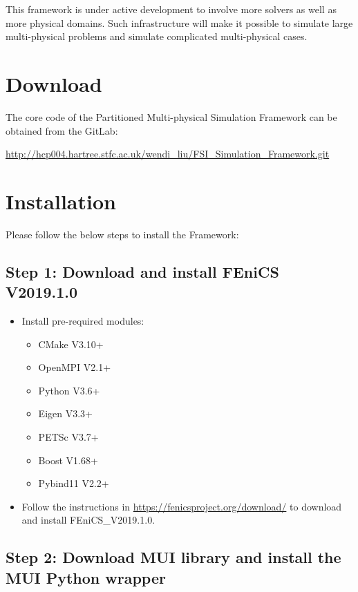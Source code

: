\documentclass[a4paper, 12pt]{article}
\begin{document}
This framework is under active development to involve more solvers as well as more physical domains.
Such infrastructure will make it possible to simulate large multi-physical problems and simulate complicated multi-physical cases.

\section{Download}

The core code of the Partitioned Multi-physical Simulation Framework can be obtained from the GitLab:

\url{http://hcp004.hartree.stfc.ac.uk/wendi\_liu/FSI\_Simulation\_Framework.git}

\section{Installation}
Please follow the below steps to install the Framework:
\subsection{Step 1: Download and install FEniCS V2019.1.0}

\begin{itemize}
	\item Install pre-required modules:
	\begin{itemize}
		\item CMake V3.10+
		\item OpenMPI V2.1+
		\item Python V3.6+
		\item Eigen V3.3+		
		\item PETSc V3.7+
		\item Boost V1.68+
		\item Pybind11 V2.2+			
	\end{itemize}	
	\item Follow the instructions in \url{https://fenicsproject.org/download/} to download and install FEniCS\_V2019.1.0.

\end{itemize}

\subsection{Step 2: Download MUI library and install the MUI Python wrapper}
\end{document}
